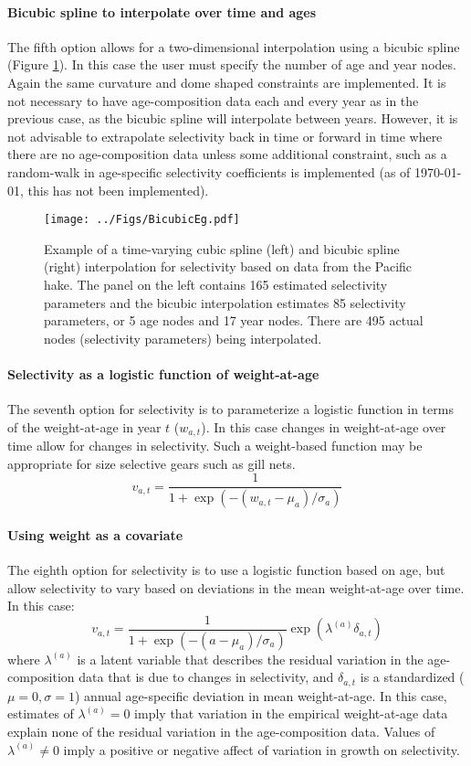 \paragraph{Bicubic spline to interpolate over time and ages}  The fifth option allows for a two-dimensional interpolation using a bicubic spline (Figure \ref{Fig3}).  In this case the user must specify the number of age and year nodes.  Again the same curvature and dome shaped constraints are implemented.  It is not necessary to have age-composition data each and every year as in the previous case, as the bicubic spline will interpolate between years.  However, it is not advisable to extrapolate selectivity back in time or forward in time where there are no age-composition data unless some additional constraint, such as a random-walk in age-specific selectivity coefficients is implemented (as of \today, this has not been implemented).

\begin{figure}[!tbp]
	\centering
	\texttt{[image: ../Figs/BicubicEg.pdf]}\\
	\caption{Example of a time-varying cubic spline (left) and bicubic spline (right) interpolation for selectivity based on data from the Pacific hake. The panel on the left contains 165 estimated selectivity parameters and the bicubic interpolation estimates 85 selectivity parameters, or 5 age nodes and 17 year nodes. There are 495 actual nodes (selectivity parameters) being interpolated.}\label{Fig3}
\end{figure}


\paragraph{Selectivity as a logistic function of weight-at-age}

The seventh option for selectivity is to parameterize a logistic function in terms of the weight-at-age in year $t$ ($w_{a,t}$). In this case changes in weight-at-age over time allow for changes in selectivity. Such a weight-based function may be appropriate for size selective gears such as gill nets. 
\[
v_{a,t} = \frac{1}{1+ \exp{(-(w_{a,t}-\mu_{a})/\sigma_a)}}
\]

\paragraph{Using weight as a covariate}
The eighth option for selectivity is to use a logistic function based on age, but allow selectivity to vary based on deviations in the mean weight-at-age over time.  In this case:
\[
v_{a,t} = \frac{1}{1+ \exp{(-(a-\mu_{a})/\sigma_a)}}\exp(\lambda^{(a)} \delta_{a,t})
\]
where $\lambda^{(a)}$ is a latent variable that describes the residual variation in the age-composition data that is due to changes  in selectivity, and $\delta_{a,t}$ is a standardized ($\mu=0, \sigma=1$) annual age-specific deviation in mean weight-at-age.  In this case, estimates of $\lambda^{(a)}=0$ imply that variation in the empirical weight-at-age data explain none of the residual variation in the age-composition data.  Values  of $\lambda^{(a)}\neq0$ imply a positive or negative affect of variation in growth on selectivity.


